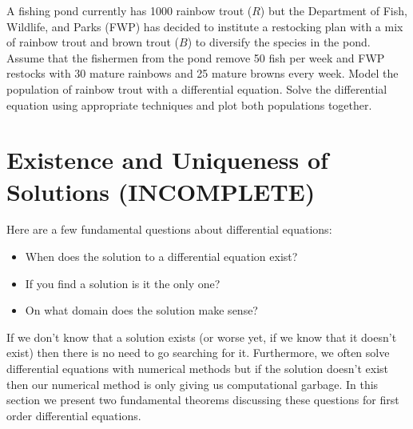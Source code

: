 \begin{problem}
    A fishing pond currently has 1000 rainbow trout ($R$) but the Department of Fish,
    Wildlife, and Parks (FWP) has decided to institute a restocking plan with a mix of rainbow
    trout and brown trout ($B$) to diversify the species in the pond.  Assume that the
    fishermen from the pond remove 50 fish per week and FWP restocks with 30 mature
    rainbows and 25 mature browns every week.  Model the population of rainbow trout with
    a differential equation.  Solve the differential equation using appropriate
    techniques and plot both populations together.
\end{problem}


\section{Existence and Uniqueness of Solutions (INCOMPLETE)}
Here are a few fundamental questions about differential equations:
\begin{itemize}
    \item When does the solution to a differential equation exist?
    \item If you find a solution is it the only one?
    \item On what domain does the solution make sense?
\end{itemize}
If we don't know that a solution exists (or worse yet, if we know that it doesn't exist)
then there is no need to go searching for it.  Furthermore, we often solve differential
equations with numerical methods but if the solution doesn't exist then our numerical
method is only giving us computational garbage. 
In this section we present two fundamental theorems discussing these questions for first
order differential equations.  

